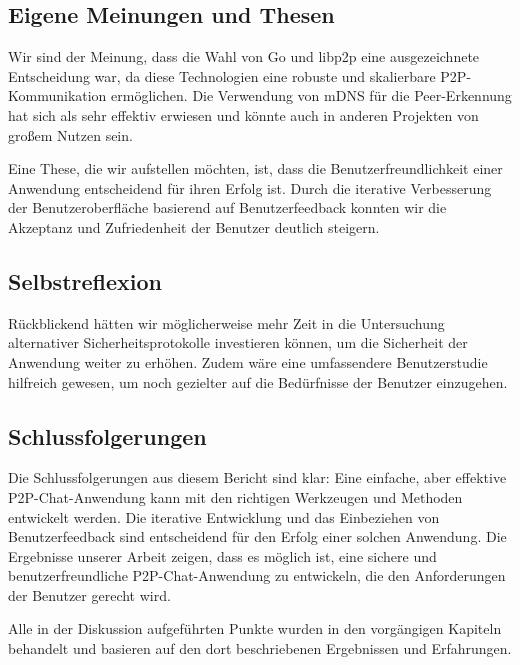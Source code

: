 \subsection{Eigene Meinungen und Thesen}

Wir sind der Meinung, dass die Wahl von Go und libp2p eine ausgezeichnete Entscheidung war, da diese Technologien eine robuste und skalierbare P2P-Kommunikation ermöglichen. Die Verwendung von mDNS für die Peer-Erkennung hat sich als sehr effektiv erwiesen und könnte auch in anderen Projekten von großem Nutzen sein.

Eine These, die wir aufstellen möchten, ist, dass die Benutzerfreundlichkeit einer Anwendung entscheidend für ihren Erfolg ist. Durch die iterative Verbesserung der Benutzeroberfläche basierend auf Benutzerfeedback konnten wir die Akzeptanz und Zufriedenheit der Benutzer deutlich steigern.

\subsection{Selbstreflexion}

Rückblickend hätten wir möglicherweise mehr Zeit in die Untersuchung alternativer Sicherheitsprotokolle investieren können, um die Sicherheit der Anwendung weiter zu erhöhen. Zudem wäre eine umfassendere Benutzerstudie hilfreich gewesen, um noch gezielter auf die Bedürfnisse der Benutzer einzugehen.

\subsection{Schlussfolgerungen}

Die Schlussfolgerungen aus diesem Bericht sind klar: Eine einfache, aber effektive P2P-Chat-Anwendung kann mit den richtigen Werkzeugen und Methoden entwickelt werden. Die iterative Entwicklung und das Einbeziehen von Benutzerfeedback sind entscheidend für den Erfolg einer solchen Anwendung. Die Ergebnisse unserer Arbeit zeigen, dass es möglich ist, eine sichere und benutzerfreundliche P2P-Chat-Anwendung zu entwickeln, die den Anforderungen der Benutzer gerecht wird.

Alle in der Diskussion aufgeführten Punkte wurden in den vorgängigen Kapiteln behandelt und basieren auf den dort beschriebenen Ergebnissen und Erfahrungen.
